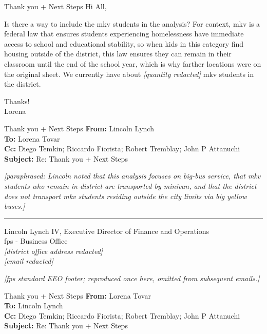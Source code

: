 {\begin{emailbox}{Thank you + Next Steps}
    \vspace{1em}
    Hi All, 
    
    Is there a way to include the \acrlong{mkv} students in the analysis?  For context, \acrlong{mkv} is a federal law that ensures students experiencing homelessness have immediate access to school and educational stability, so when kids in this category find housing outside of the district, this law ensures they can remain in their classroom until the end of the school year, which is why farther locations were on the original sheet.  We currently have about \textit{[quantity redacted]} \acrshort{mkv} students in the district. \vspace{1em}
    
    Thanks! \\
    Lorena
\end{emailbox}

\begin{emailbox}{Thank you + Next Steps}
    \textbf{From:} Lincoln Lynch \\
    \textbf{To:} Lorena Tovar \\
    \textbf{Cc:} Diego Temkin; Riccardo Fiorista; Robert Tremblay; John P Attanuchi \\
    \textbf{Subject:} Re: Thank you + Next Steps

    \vspace{1em}
    \textit{[paraphrased: Lincoln noted that this analysis focuses on big-bus service, that \gls{mkv} students who remain in-district are transported by minivan, and that the district does not transport \gls{mkv} students residing outside the city limits via big yellow buses.]}
    
    \noindent\rule{\textwidth}{1pt}

    Lincoln Lynch IV, Executive Director of Finance and Operations \\
    \Acrlong{fps} - Business Office \\
    \textit{[district office address redacted]} \\
    \textit{[email redacted]} \vspace{1em}

    \textit{[\gls{fps} standard EEO footer; reproduced once here, omitted from subsequent emails.]}
\end{emailbox}

\begin{emailbox}{Thank you + Next Steps}
    \textbf{From:} Lorena Tovar \\
    \textbf{To:} Lincoln Lynch \\
    \textbf{Cc:} Diego Temkin; Riccardo Fiorista; Robert Tremblay; John P Attanuchi \\
    \textbf{Subject:} Re: Thank you + Next Steps


\end{emailbox}}
